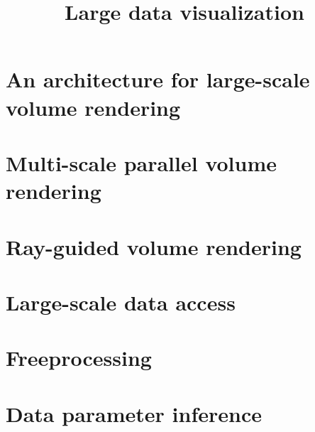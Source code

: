 \documentclass[12pt]{report}
\title{Large data visualization}
\begin{document}


\chapter{An architecture for large-scale volume rendering}


\chapter{Multi-scale parallel volume rendering}


\chapter{Ray-guided volume rendering}


\chapter{Large-scale data access}


\chapter{Freeprocessing}


\chapter{Data parameter inference}




\end{document}
